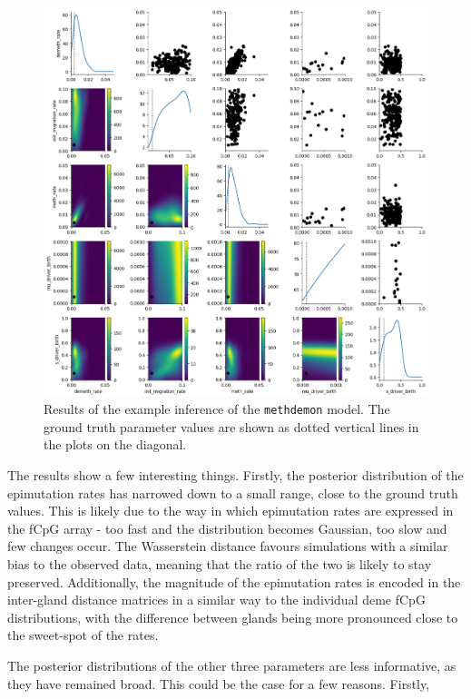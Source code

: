 \begin{figure}[h]
    \centering
    \includegraphics[width=\textwidth]{Chapter_4/figures/example_inference.png}
    \caption{Results of the example inference of the \texttt{methdemon} model.
    The ground truth parameter values are shown as dotted vertical lines in the
    plots on the diagonal.}
    \label{fig:example_inference}
\end{figure}
\clearpage
The results show a few interesting things. Firstly, the posterior distribution
of the epimutation rates has narrowed down to a small range, close to the ground
truth values. This is likely due to the way in which epimutation rates are
expressed in the fCpG array - too fast and the distribution becomes Gaussian,
too slow and few changes occur. The Wasserstein distance favours simulations
with a similar bias to the observed data, meaning that the ratio of the two is
likely to stay preserved. Additionally, the magnitude of the epimutation rates
is encoded in the inter-gland distance matrices in a similar way to the individual
deme fCpG distributions, with the difference between glands being more pronounced
close to the sweet-spot of the rates. \par
The posterior distributions of the other three parameters are less informative,
as they have remained broad. This could be the case for a few reasons. Firstly,
